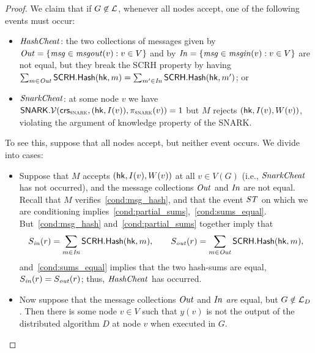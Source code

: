 \begin{proof}
	We claim that if $G \not \in \mathcal{L}$,
	whenever all nodes accept, one of the following events must occur:
	\begin{itemize}
		\item $\mathit{ HashCheat }$:
			the two collections of messages
			given by $\mathit{ Out } = \left \{{ \mathit{ msg } \in \mathit{ msgout }(v) : v \in V } \right \}$
			and by $\mathit{ In } = \left \{{ \mathit{ msg } \in \mathit{ msgin }(v) : v \in V} \right \}$
			are not equal, but they
			break the SCRH property by having
			$\sum_{ m \in \mathit{ Out } }\mathsf{SCRH}.\mathsf{Hash}(\mathsf{hk}, m) = \sum_{ m' \in \mathit{ In } }\mathsf{SCRH}.\mathsf{Hash}(\mathsf{hk}, m')$;
			or
		\item $\mathit{ SnarkCheat }$:
			at some node $v$ we have
			$\mathsf{SNARK}.\mathcal{V}(\mathsf{crs}_\textsc{snark}, (\mathsf{hk}, I(v)), \pi_\textsc{snark}(v)) = 1$
			but $M$ rejects $(\mathsf{hk}, I(v), W(v))$,
			violating the argument of knowledge property of the SNARK.
	\end{itemize}
	To see this, suppose that all nodes accept,
	but neither event occurs. We divide into cases:
	\begin{itemize}
		\item Suppose that $M$ accepts $(\mathsf{hk}, I(v), W(v))$ at all $v \in V(G)$
			(i.e., $\mathit{ SnarkCheat }$ has not occurred),
			and the message collections $\mathit{ Out }$ and $\mathit{ In }$ are not equal.
			Recall that $M$ verifies~\eqref{cond:msg_hash},
			and that the event $\mathit{ ST }$ on which we are conditioning 
			implies~\eqref{cond:partial_sums},~\eqref{cond:sums_equal}.
			But~\eqref{cond:msg_hash} and~\eqref{cond:partial_sums}
			together imply that
			\begin{equation*}
				S_{\mathit{ in }}(r) = \sum_{m \in \mathit{ In }} \mathsf{SCRH}.\mathsf{Hash}(\mathsf{hk}, m),
				\qquad
				S_{\mathit{ out }}(r) = \sum_{m \in \mathit{ Out }} \mathsf{SCRH}.\mathsf{Hash}(\mathsf{hk}, m),
			\end{equation*}
			and~\eqref{cond:sums_equal} implies that
			the two hash-sums are equal, $S_{\mathit{ in }}(r) = S_{\mathit{ out }}(r)$;
			thus, $\mathit{ HashCheat }$ has occurred.
		\item Now suppose that the message collections $\mathit{ Out }$ and $\mathit{ In }$ \emph{are} equal,
			but $G \notin \mathcal{L}_D$.
			Then there is some node $v \in V$ such that $y(v)$ is not the output of the
			distributed algorithm $D$ at node $v$ when executed in $G$.



\end{itemize}
\end{proof}
